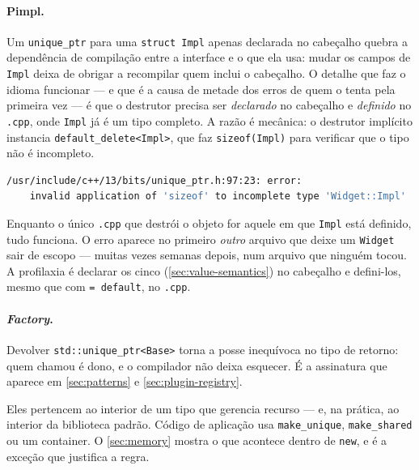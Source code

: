 \paragraph{Pimpl.} Um \texttt{unique\_ptr} para uma \texttt{struct Impl} apenas
declarada no cabeçalho quebra a dependência de compilação entre a interface e o
que ela usa: mudar os campos de \texttt{Impl} deixa de obrigar a recompilar
quem inclui o cabeçalho. O detalhe que faz o idioma funcionar --- e que é a
causa de metade dos erros de quem o tenta pela primeira vez --- é que o
destrutor precisa ser \emph{declarado} no cabeçalho e \emph{definido} no
\texttt{.cpp}, onde \texttt{Impl} já é um tipo completo. A razão é mecânica: o
destrutor implícito instancia \texttt{default\_delete<Impl>}, que faz
\texttt{sizeof(Impl)} para verificar que o tipo não é incompleto.

\begin{lstlisting}[style=bt, language=bash,
    caption={Erro real do GCC 13.3 ao esquecer o destrutor fora de linha ---
             note que ele aponta para dentro do \texttt{<memory>}, não para o
             seu código.}]
/usr/include/c++/13/bits/unique_ptr.h:97:23: error:
    invalid application of 'sizeof' to incomplete type 'Widget::Impl'
\end{lstlisting}

\begin{armadilha}
Enquanto o único \texttt{.cpp} que destrói o objeto for aquele em que
\texttt{Impl} está definido, tudo funciona. O erro aparece no primeiro
\emph{outro} arquivo que deixe um \texttt{Widget} sair de escopo --- muitas
vezes semanas depois, num arquivo que ninguém tocou. A profilaxia é declarar os
cinco (\cref{sec:value-semantics}) no cabeçalho e defini-los, mesmo que com
\texttt{= default}, no \texttt{.cpp}.
\end{armadilha}

\paragraph{\emph{Factory}.} Devolver \texttt{std::unique\_ptr<Base>} torna a
posse inequívoca no tipo de retorno: quem chamou é dono, e o compilador não
deixa esquecer. É a assinatura que aparece em \cref{sec:patterns} e
\cref{sec:plugin-registry}.

\begin{regra}
Eles pertencem ao interior de um tipo que gerencia recurso --- e, na prática, ao
interior da biblioteca padrão. Código de aplicação usa \texttt{make\_unique},
\texttt{make\_shared} ou um container. O \cref{sec:memory} mostra o que acontece
dentro de \texttt{new}, e é a exceção que justifica a regra.
\end{regra}

